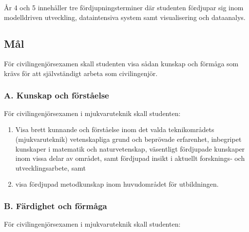 År 4 och 5 innehåller tre fördjupningsterminer där studenten fördjupar sig inom
modelldriven utveckling, dataintensiva system samt visualisering och
dataanalys.

\subsection*{Mål}

För civilingenjörsexamen skall studenten visa sådan kunskap och förmåga
som krävs för att självständigt arbeta som civilingenjör.

\subsubsection*{A. Kunskap och förståelse}

För civilingenjörsexamen i mjukvaruteknik skall studenten:

\begin{enumerate}
\def\labelenumi{A.\arabic{enumi}.}
\tightlist
\item
  Visa brett kunnande och förståelse inom det valda teknikområdets
  (mjukvaruteknik) vetenskapliga grund och beprövade erfarenhet,
  inbegripet kunskaper i matematik och naturvetenskap, väsentligt
  fördjupade kunskaper inom vissa delar av området, samt fördjupad
  insikt i aktuellt forsknings‐ och utvecklingsarbete, samt
\item
  visa fördjupad metodkunskap inom huvudområdet för utbildningen.
\end{enumerate}

\subsubsection*{B. Färdighet och förmåga}

För civilingenjörsexamen i mjukvaruteknik skall studenten:


